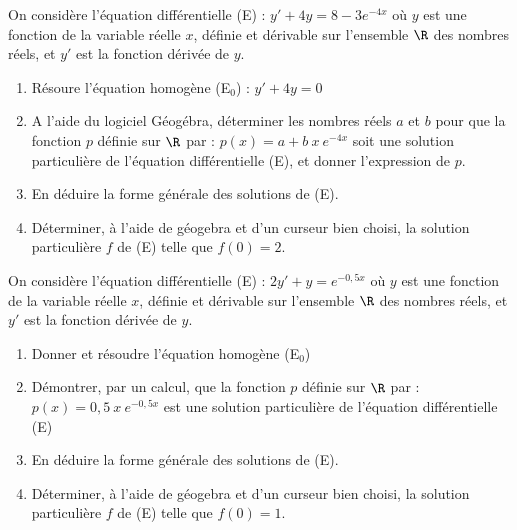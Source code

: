 \begin{exercice_cours}[\quad]{}

	On considère l’équation différentielle (E) : $y' + 4y = 8-3e^{-4x}$ où $y$ est une fonction de la variable réelle $x$, définie et dérivable sur l’ensemble $\R$ des nombres réels, et $y'$ est la fonction dérivée de $y$.

\begin{enumerate}
	\item Résoure l'équation homogène (E$_0$) : $y'+4y=0$     \hfill\reponseLigne[7cm]{}
	\item A l’aide du logiciel Géogébra, déterminer les nombres réels $a$ et $b$ pour que la fonction $p$ définie sur $\R$ par : $p(x) = a + b~x~e^{-4x}$ soit une solution particulière de l'équation différentielle (E), et donner l’expression de $p$.  \hfill\reponseLigne[7cm]{}  
	\item En déduire la forme générale des solutions de (E).  \hfill\reponseLigne[7cm]{}
	\item Déterminer, à l'aide de géogebra et d'un curseur bien choisi, la solution particulière $f$ de (E) telle que $f(0)=2$.  \hfill\reponseLigne[7cm]{}    
\end{enumerate}
\end{exercice_cours}
\begin{exercice_cours}[\quad]{}

	On considère l’équation différentielle (E) : $2y' + y = e^{-0,5x}$ où $y$ est une fonction de la variable réelle $x$, définie et dérivable sur l’ensemble $\R$ des nombres réels, et $y'$ est la fonction dérivée de $y$.

\begin{enumerate}
	\item Donner et résoudre l'équation homogène (E$_0$)  	    \hfill\reponseLigne[7cm]{}
	\item Démontrer, par un calcul, que la fonction $p$ définie sur $\R$ par : $p(x) = 0,5~x~e^{-0,5x}$ est une solution particulière de l'équation différentielle (E)  \hfill\reponseLigne[7cm]{}
	\item En déduire la forme générale des solutions de (E).    \hfill\reponseLigne[7cm]{}
	\item Déterminer, à l'aide de géogebra et d'un curseur bien choisi, la solution particulière $f$ de (E) telle que $f(0)=1$.   \hfill\reponseLigne[7cm]{}
\end{enumerate}
\end{exercice_cours}

